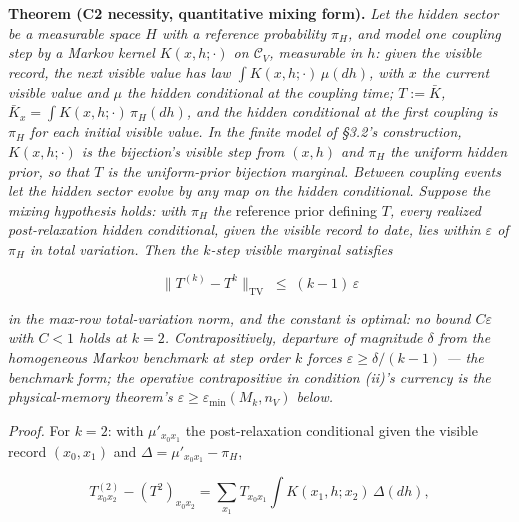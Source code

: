 \documentclass[
]{article}
\begin{document}
\textbf{Theorem (C2 necessity, quantitative mixing form).} \emph{Let the
hidden sector be a measurable space \(H\) with a reference probability
\(\pi_H\), and model one coupling step by a Markov kernel
\(K(x, h; \cdot)\) on \(\mathcal{C}_V\), measurable in \(h\): given the
visible record, the next visible value has law
\(\int K(x, h; \cdot)\,\mu(dh)\), with \(x\) the current visible value
and \(\mu\) the hidden conditional at the coupling time;
\(T := \bar{K}\), \(\bar{K}_x = \int K(x, h; \cdot)\,\pi_H(dh)\), and
the hidden conditional at the first coupling is \(\pi_H\) for each
initial visible value. In the finite model of §3.2's construction,
\(K(x, h; \cdot)\) is the bijection's visible step from \((x, h)\) and
\(\pi_H\) the uniform hidden prior, so that \(T\) is the uniform-prior
bijection marginal. Between coupling events let the hidden sector evolve
by any map on the hidden conditional. Suppose the mixing hypothesis
holds: with \(\pi_H\) the }reference prior defining \(T\)\emph{, every
realized post-relaxation hidden conditional, given the visible record to
date, lies within \(\varepsilon\) of \(\pi_H\) in total variation. Then
the \(k\)-step visible marginal satisfies}

\[\| T^{(k)} - T^k \|_{\mathrm{TV}} \;\leq\; (k-1)\,\varepsilon\]

\emph{in the max-row total-variation norm, and the constant is optimal:
no bound \(C\varepsilon\) with \(C < 1\) holds at \(k = 2\).
Contrapositively, departure of magnitude \(\delta\) from the homogeneous
Markov benchmark at step order \(k\) forces
\(\varepsilon \geq \delta/(k-1)\) --- the benchmark form; the operative
contrapositive in condition (ii)'s currency is the physical-memory
theorem's \(\varepsilon \geq \varepsilon_{\min}(M_k, n_V)\) below.}

\emph{Proof.} For \(k = 2\): with \(\mu'_{x_0 x_1}\) the post-relaxation
conditional given the visible record \((x_0, x_1)\) and
\(\Delta = \mu'_{x_0 x_1} - \pi_H\),

\[T^{(2)}_{x_0 x_2} - (T^2)_{x_0 x_2} = \sum_{x_1} T_{x_0 x_1} \int K(x_1, h; x_2)\,\Delta(dh),\]
\end{document}
